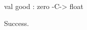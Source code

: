 \chklistingtrue
{}
\begin{ChkListingMsg}
val good : zero -C-> float
\end{ChkListingMsg}
\begin{ChkListingErr}
Success.
\end{ChkListingErr}
